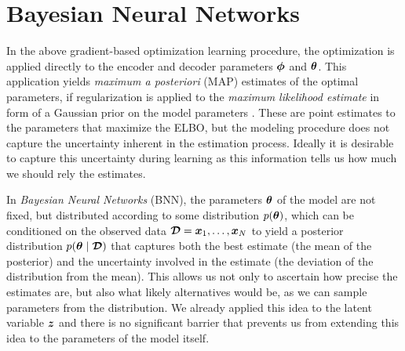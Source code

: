 \section{Bayesian Neural Networks}
In the above gradient-based optimization learning procedure, the optimization is applied directly to the encoder and decoder parameters $\bm{ \phi }$ and $\bm{ \theta }$. This application yields \textit{maximum a posteriori} (MAP) estimates of the optimal parameters, if regularization is applied to the \textit{maximum likelihood estimate} in form of a Gaussian prior on the model parameters \cite{blundell2015weight}. These are point estimates to the parameters that maximize the ELBO, but the modeling procedure does not capture the uncertainty inherent in the estimation process. Ideally it is desirable to capture this uncertainty during learning as this information tells us how much we should rely the estimates.

In \textit{Bayesian Neural Networks} (BNN), the parameters $\bm{ \theta }$ of the model are not fixed, but distributed according to some distribution $p(\bm{ \theta })$, which can be conditioned on the observed data $\bm{ \mathcal{D} } = \bm{ x }_1, \ldots, \bm{ x }_N$ to yield a posterior distribution $p(\bm{ \theta } \mid \bm{ \mathcal{D} })$ that captures both the best estimate (the mean of the posterior) and the uncertainty involved in the estimate (the deviation of the distribution from the mean). This allows us not only to ascertain how precise the estimates are, but also what likely alternatives would be, as we can sample parameters from the distribution. We already applied this idea to the latent variable $\bm{ z }$ and there is no significant barrier that prevents us from extending this idea to the parameters of the model itself.

